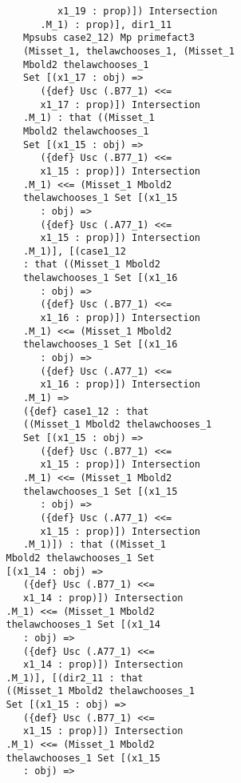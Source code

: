 \documentclass[12pt]{article}
\begin{document}
\begin{verbatim}
                         x1_19 : prop)]) Intersection 
                      .M_1) : prop)], dir1_11 
                   Mpsubs case2_12) Mp primefact3 
                   (Misset_1, thelawchooses_1, (Misset_1 
                   Mbold2 thelawchooses_1 
                   Set [(x1_17 : obj) => 
                      ({def} Usc (.B77_1) <<= 
                      x1_17 : prop)]) Intersection 
                   .M_1) : that ((Misset_1 
                   Mbold2 thelawchooses_1 
                   Set [(x1_15 : obj) => 
                      ({def} Usc (.B77_1) <<= 
                      x1_15 : prop)]) Intersection 
                   .M_1) <<= (Misset_1 Mbold2 
                   thelawchooses_1 Set [(x1_15 
                      : obj) => 
                      ({def} Usc (.A77_1) <<= 
                      x1_15 : prop)]) Intersection 
                   .M_1)], [(case1_12 
                   : that ((Misset_1 Mbold2 
                   thelawchooses_1 Set [(x1_16 
                      : obj) => 
                      ({def} Usc (.B77_1) <<= 
                      x1_16 : prop)]) Intersection 
                   .M_1) <<= (Misset_1 Mbold2 
                   thelawchooses_1 Set [(x1_16 
                      : obj) => 
                      ({def} Usc (.A77_1) <<= 
                      x1_16 : prop)]) Intersection 
                   .M_1) => 
                   ({def} case1_12 : that 
                   ((Misset_1 Mbold2 thelawchooses_1 
                   Set [(x1_15 : obj) => 
                      ({def} Usc (.B77_1) <<= 
                      x1_15 : prop)]) Intersection 
                   .M_1) <<= (Misset_1 Mbold2 
                   thelawchooses_1 Set [(x1_15 
                      : obj) => 
                      ({def} Usc (.A77_1) <<= 
                      x1_15 : prop)]) Intersection 
                   .M_1)]) : that ((Misset_1 
                Mbold2 thelawchooses_1 Set 
                [(x1_14 : obj) => 
                   ({def} Usc (.B77_1) <<= 
                   x1_14 : prop)]) Intersection 
                .M_1) <<= (Misset_1 Mbold2 
                thelawchooses_1 Set [(x1_14 
                   : obj) => 
                   ({def} Usc (.A77_1) <<= 
                   x1_14 : prop)]) Intersection 
                .M_1)], [(dir2_11 : that 
                ((Misset_1 Mbold2 thelawchooses_1 
                Set [(x1_15 : obj) => 
                   ({def} Usc (.B77_1) <<= 
                   x1_15 : prop)]) Intersection 
                .M_1) <<= (Misset_1 Mbold2 
                thelawchooses_1 Set [(x1_15 
                   : obj) => 

\end{verbatim}
\end{document}
